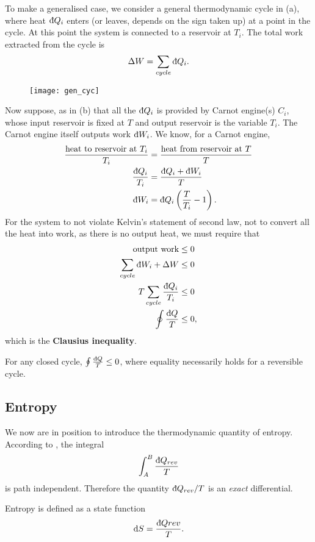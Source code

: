 To make a generalised case, we consider a general thermodynamic cycle in (a), where heat $\indiff Q_i$ enters (or leaves, depends on the sign taken up) at a point in the cycle. 
At this point the system is connected to a reservoir at $T_i$. The total work extracted from the cycle is 
\begin{equation}
\Delta W = \sum_{cycle}\indiff Q_i. 
\end{equation}
\begin{figure}[!htbp]
	\texttt{[image: gen\_cyc]}
	\centering
	\caption{}
	\label{gen_cyc}
\end{figure}
Now suppose, as in (b) that all the $\indiff Q_i$ is provided by Carnot engine(s) $C_i$, 
whose input reservoir is fixed at $T$ and output reservoir is the variable $T_i$. 
The Carnot engine itself outputs work $\indiff W_i$. 
We know, for a Carnot engine, 
\begin{equation}
\begin{aligned}
\frac{\text{heat to reservoir at}\ T_i}{T_i}&=\frac{\text{heat from reservoir at}\ T}{T} \\
\frac{\indiff Q_i}{T_i}&=\frac{\indiff Q_i + \indiff W_i}{T} \\
\indiff W_i&=\indiff Q_i \left(\frac{T}{T_i}-1\right). 
\end{aligned}
\end{equation}
For the system to not violate Kelvin's statement of second law, \ie not to convert all the heat into work, as there is no output heat, we must require that 
\begin{equation}
\begin{aligned}
\text{output work}&\leq0 \\
\sum_{cycle}\indiff W_i + \Delta W &\leq 0 \\
T\sum_{cycle}\frac{\indiff Q_i}{T_i}&\leq 0 \\
\oint\frac{\indiff Q}{T}&\leq0, 
\end{aligned}
\end{equation}
which is the \textbf{Clausius inequality}. 

\begin{thrm}
\label{clau_thrm}
For any closed cycle, $\oint \frac{\indiff Q}{T}\leq0$, where equality necessarily holds for a reversible cycle. 
\end{thrm}

\subsection{Entropy}
We now are in position to introduce the thermodynamic quantity of entropy. 
According to , the integral 
\begin{equation}
\int_A^B \frac{\indiff Q_{rev}}{T}
\end{equation}
is path independent. Therefore the quantity $\indiff Q_{rev}/T$ is an \textit{exact} differential. 
\begin{defi}[Entropy]
Entropy is defined as a state function
\begin{equation}
\dif S=\frac{\indiff Q{rev}}{T}. 
\end{equation}
\end{defi}

